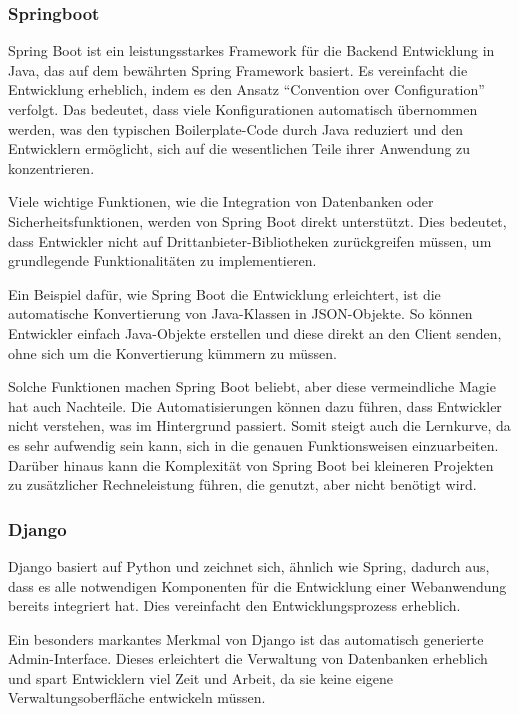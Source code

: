 \documentclass[biblatex]{lni}
\begin{document}
\subsubsection{Springboot}

Spring Boot ist ein leistungsstarkes Framework für die Backend Entwicklung in Java,
das auf dem bewährten Spring Framework basiert.
Es vereinfacht die Entwicklung erheblich, indem es den Ansatz “Convention over Configuration” verfolgt.
Das bedeutet, dass viele Konfigurationen automatisch übernommen werden,
was den typischen Boilerplate-Code durch Java reduziert und den Entwicklern ermöglicht,
sich auf die wesentlichen Teile ihrer Anwendung zu konzentrieren.

Viele wichtige Funktionen, wie die Integration von Datenbanken oder Sicherheitsfunktionen,
werden von Spring Boot direkt unterstützt.
Dies bedeutet, dass Entwickler nicht auf Drittanbieter-Bibliotheken zurückgreifen müssen,
um grundlegende Funktionalitäten zu implementieren.

Ein Beispiel dafür, wie Spring Boot die Entwicklung erleichtert, ist die automatische Konvertierung von Java-Klassen in JSON-Objekte.
So können Entwickler einfach Java-Objekte erstellen und diese direkt an den Client senden, ohne sich um die Konvertierung kümmern zu müssen.

Solche Funktionen machen Spring Boot beliebt, aber diese vermeindliche Magie hat auch Nachteile.
Die Automatisierungen können dazu führen, dass Entwickler nicht verstehen, was im Hintergrund passiert.
Somit steigt auch die Lernkurve, da es sehr aufwendig sein kann, sich in die genauen Funktionsweisen einzuarbeiten.
Darüber hinaus kann die Komplexität von Spring Boot bei kleineren Projekten zu zusätzlicher Rechneleistung führen, die genutzt, aber nicht benötigt wird.

\subsubsection{Django}

Django basiert auf Python und zeichnet sich, ähnlich wie Spring, dadurch aus,
dass es alle notwendigen Komponenten für die Entwicklung einer Webanwendung bereits integriert hat.
Dies vereinfacht den Entwicklungsprozess erheblich.

Ein besonders markantes Merkmal von Django ist das automatisch generierte Admin-Interface.
Dieses erleichtert die Verwaltung von Datenbanken erheblich und spart Entwicklern viel Zeit und Arbeit,
da sie keine eigene Verwaltungsoberfläche entwickeln müssen.
\end{document}
